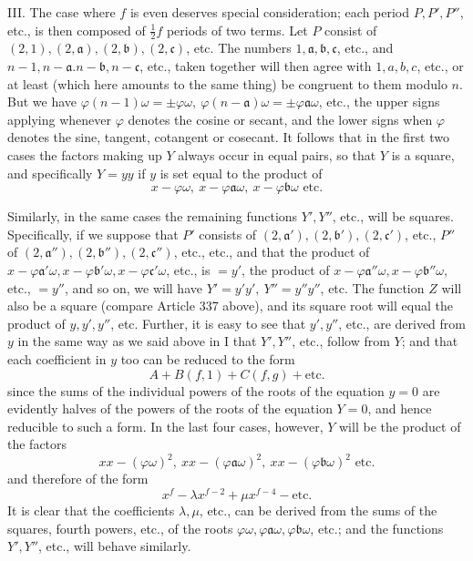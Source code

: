 III. The case where \(f\) is even deserves special consideration; each period \(P,\allowbreak P',\allowbreak P''\), etc., is then composed of \(\tfrac12f\) periods of two terms. Let \(P\) consist of \((2,1),\allowbreak (2,\mathfrak{a}),\allowbreak (2,\mathfrak{b}),\allowbreak (2,\mathfrak{c})\), etc. The numbers \(1,\allowbreak \mathfrak{a},\allowbreak \mathfrak{b},\allowbreak \mathfrak{c}\), etc., and \(n-1,\allowbreak n-\mathfrak{a}.n-\mathfrak{b},\allowbreak n-\mathfrak{c}\), etc., taken together will then agree with \(1,\allowbreak a,\allowbreak b,\allowbreak c\), etc., or at least (which here amounts to the same thing) be congruent to them modulo \(n\). But we have \(\varphi(n-1)\omega=\pm\varphi\omega,\allowbreak \ \varphi(n-\mathfrak{a})\omega=\pm\varphi \mathfrak{a}\omega\), etc., the upper signs applying whenever \(\varphi\) denotes the cosine or secant, and the lower signs when \(\varphi\) denotes the sine, tangent, cotangent or cosecant. It follows that in the first two cases the factors making up \(Y\) always occur in equal pairs, so that \(Y\) is a square, and specifically \(Y=yy\) if \(y\) is set equal to the product of \[x-\varphi\omega,\ x-\varphi \mathfrak{a}\omega,\ x-\varphi \mathfrak{b}\omega\text{ etc.}\]

Similarly, in the same cases the remaining functions \(Y',\allowbreak Y''\), etc., will be squares. Specifically, if we suppose that \(P'\) consists of \((2,\mathfrak{a}'),\allowbreak (2,\mathfrak{b}'),\allowbreak (2,\mathfrak{c}')\), etc., \(P''\) of \((2,\mathfrak{a}''),\allowbreak (2,\mathfrak{b}''),\allowbreak (2,\mathfrak{c}'')\), etc., etc., and that the product of \(x-\varphi \mathfrak{a}'\omega,\allowbreak x-\varphi \mathfrak{b}'\omega,\allowbreak x-\varphi \mathfrak{c}'\omega\), etc., is \(=y'\), the product of \(x-\varphi \mathfrak{a}''\omega,\allowbreak x-\varphi \mathfrak{b}''\omega\), etc., \(=y''\), and so on, we will have \(Y'=y'y',\allowbreak \ Y''=y''y''\), etc. The function \(Z\) will also be a square (compare Article 337 above), and its square root will equal the product of \(y,\allowbreak y',\allowbreak y''\), etc. Further, it is easy to see that \(y',\allowbreak y''\), etc., are derived from \(y\) in the same way as we said above in I that \(Y',\allowbreak Y''\), etc., follow from \(Y\); and that each coefficient in \(y\) too can be reduced to the form \[A+B(f,1)+C(f,g)+\text{etc.}\] since the sums of the individual powers of the roots of the equation \(y=0\) are evidently halves of the powers of the roots of the equation \(Y=0\), and hence reducible to such a form. In the last four cases, however, \(Y\) will be the product of the factors \[xx-(\varphi\omega)^2,\ xx-(\varphi \mathfrak{a}\omega)^2,\ xx-(\varphi \mathfrak{b}\omega)^2\text{ etc.}\] and therefore of the form \[x^f-\lambda x^{f-2}+\mu x^{f-4}-\text{etc.}\] It is clear that the coefficients \(\lambda,\allowbreak \mu\), etc., can be derived from the sums of the squares, fourth powers, etc., of the roots \(\varphi\omega,\allowbreak \varphi \mathfrak{a}\omega,\allowbreak \varphi \mathfrak{b}\omega\), etc.; and the functions \(Y',\allowbreak Y''\), etc., will behave similarly.

